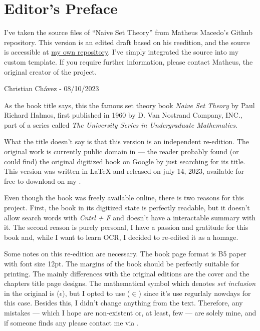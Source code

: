 \chapter*{Editor's Preface}

I've taken the source files of ``Naive Set Theory'' from Matheus Macedo's Github repository. This version is an edited draft based on his reedition, and the source is accessible at  \href{https://github.com/christian-chavez/NST-Reedition}{my  own repository}. I've simply integrated the source into my custom template. If you require further information, please contact Matheus, the original creator of the project.

\begin{flushright}
    Christian Chávez  - 08/10/2023
\end{flushright}

As the book title says, this the famous set theory book \textit{Naive Set Theory} by Paul Richard Halmos, first published in 1960 by D. Van Nostrand Company, INC., part of a series called \textit{The University Series in Undergraduate Mathematics}.

What the title doesn't say is that this version is an independent re-edition. The original work is currently public domain in \href{https://babel.hathitrust.org}{\color{blue}{Hathi Trust Digital Library}} — the reader probably found (or could find) the original digitized book on Google by just searching for its title. This version was written in LaTeX and released on july 14, 2023, available for free to download on my \href{https://github.com/matheusgirola/Halmos-Naive-Set-Theory-OCR-LaTeX-Reedition}{\color{blue}{Github repository}}.

Even though the book was freely available online, there is two reasons for this project. First, the book in its digitized state is perfectly readable, but it doesn't allow search words with \textit{Cntrl + F} and doesn't have a interactable summary with it. The second reason is purely personal, I have a passion and gratitude for this book and, while I want to learn OCR, I decided to re-edited it as a homage.

Some notes on this re-edition are necessary. The book page format is B5 paper with font size 12pt. The margins of the book should be perfectly suitable for printing. The mainly differences with the original editions are the cover and the chapters title page designs. The mathematical symbol which denotes \textit{set inclusion} in the original is ($\epsilon$), but I opted to use ($\in$) since it's use regurlaly nowdays for this case. Besides this, I didn't change anything from the text. Therefore, any mistakes — which I hope are non-existent or, at least, few —  are solely mine, and if someone finds any please contact me via  \href{mailto:matheusgirola@gmail.com}{\color{blue}{e-mail}}.

